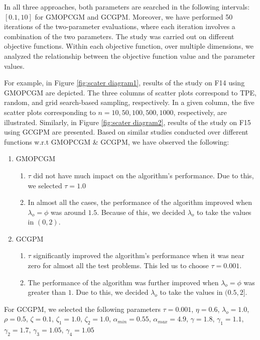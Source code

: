 \documentclass{article}
\theoremstyle{remark}
\begin{document}
{{In all three approaches, both parameters are searched in the following intervals: $[0.1,10]$ for GMOPCGM and GCGPM. Moreover, we have performed 50 iterations of the two-parameter evaluations, where each iteration involves a combination of the two parameters. The study was carried out on different objective functions. Within each objective function, over multiple dimensions, we analyzed the relationship between the objective function value and the parameter values.   
 
For example, in Figure \ref{fig:scater diagram1}, results of the study on F14 using GMOPCGM are depicted. The three columns of scatter plots correspond to TPE, random, and grid search-based sampling, respectively. In a given column, the five scatter plots corresponding to $n=10,50, 100, 500, 1000$, respectively, are illustrated. Similarly, in Figure \ref{fig:scater diagram2}, results of the study on F15 using GCGPM are presented. Based on similar studies conducted over different functions w.r.t GMOPCGM \& GCGPM, we have observed the following:
\begin{enumerate}
	\item GMOPCGM
	\begin{enumerate}
		\item[(i)]$\tau$ did not have much impact on the algorithm's performance. Due to this, we selected $\tau=1.0$
		\item[(ii)] In almost all the cases, the performance of the algorithm improved when $\lambda_o=\phi$ was around $1.5$. Because of this, we decided $\lambda_o$ to take the values in $(0, 2)$.
	\end{enumerate}
	\item GCGPM
	\begin{enumerate}
		\item[(i)] $\tau$ significantly improved the algorithm's performance when it was near zero for almost all the test problems. This led us to choose $\tau=0.001$.
		\item[(ii)] The performance of the algorithm was further improved when $\lambda_o=\phi$ was greater than $1$. Due to this, we decided $\lambda_o$ to take the values in $(0.5, 2]$.
	\end{enumerate}
\end{enumerate}
 For GCGPM, we selected the following parameters
$\tau=0.001$, $\eta=0.6$, $\lambda_o=1.0$, $\rho=0.5$, $\zeta=0.1$, $\zeta_1=1.0$, $\zeta_2=1.0$, $\alpha_{min}=0.55$, $\alpha_{max}=4.9$, $\gamma=1.8$, 
$\gamma_1=1.1$, $\gamma_2=1.7$,   $\gamma_3=1.05$, $\gamma_4=1.05$\\
}}
\end{document}
